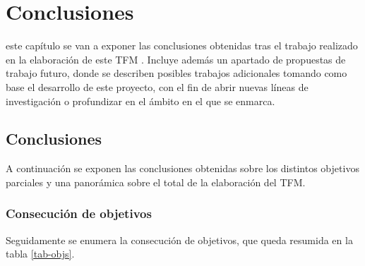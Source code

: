 \chapter{Conclusiones}
\label{chap:conclusiones}

 este capítulo se van a exponer las conclusiones obtenidas tras el trabajo
realizado
en la elaboración de este \acs{TFM} . Incluye además un apartado de propuestas de
trabajo
futuro, donde se describen posibles trabajos adicionales tomando como base el
desarrollo de
este proyecto, con el fin de abrir nuevas líneas de investigación o profundizar
en el ámbito
en el que se enmarca.

\section{Conclusiones}
A continuación se exponen las conclusiones obtenidas sobre los distintos
objetivos parciales y una panorámica sobre el total de la elaboración del
\acs{TFM}.

\subsection{Consecución de objetivos}
Seguidamente se enumera la consecución de objetivos, que queda resumida en la
tabla \ref{tab-objs}.



